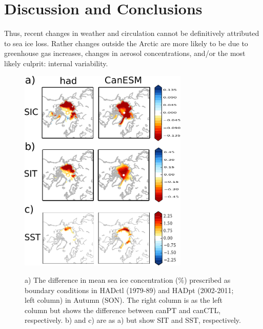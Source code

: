 \documentclass[twocol]{ametsoc}
\begin{document}
\section{Discussion and Conclusions}

Thus, recent changes in weather and circulation cannot be definitively attributed to sea ice loss. Rather changes outside the Arctic are more likely to be due to greenhouse gas increases, changes in aerosol concentrations, and/or the most likely culprit: internal variability.

\begin{figure}[t]
  \noindent\includegraphics[width=19pc,angle=0]{oneseasBCsnonsidc.pdf}\\
  \caption{a) The difference in mean sea ice concentration (\%) prescribed as boundary conditions in HADctl (1979-89) and HADpt (2002-2011; left column) in Autumn (SON). The right column is as the left column but shows the difference between canPT and canCTL, respectively. b) and c) are as a) but show SIT and SST, respectively.
}\label{fig:fig1}
\end{figure}
\end{document}
